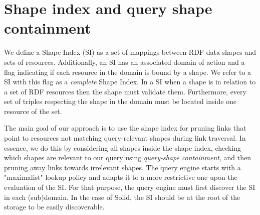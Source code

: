 \section{Shape index and query shape containment}

We define a Shape Index (SI) as a set of mappings between RDF data shapes and sets of resources.
Additionally, an SI has an associated domain of action 
and a flag indicating if each resource in the domain is bound by a shape. 
We refer to a SI with this flag as a \emph{complete} Shape Index.
In a SI when a shape is in relation to a set of RDF resources then the shape must validate them.
Furthermore, every set of triples respecting the shape in the domain must be located inside one resource of the set.

The main goal of our approach is to use the shape index for pruning links that point to resources not matching query-relevant shapes during link traversal.
In essence, we do this by considering all shapes inside the shape index,
checking which shapes are relevant to our query using \emph{query-shape containment},
and then pruning away links towards irrelevant shapes.
The query engine starts with a "maximalist"  lookup policy and adapts it to a more restrictive one  upon the evaluation of the SI.
For that purpose, the query engine must first discover the SI in each (sub)domain.
In the case of Solid, the SI should be at the root of the storage  to be easily discoverable.

